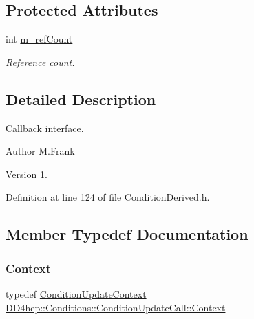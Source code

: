 \subsection*{Protected Attributes}
\begin{DoxyCompactItemize}
\item 
int \hyperlink{class_d_d4hep_1_1_conditions_1_1_condition_update_call_a7456626d494306f498809d5d57150b28}{m\+\_\+ref\+Count}
\begin{DoxyCompactList}\small\item\em Reference count. \end{DoxyCompactList}\end{DoxyCompactItemize}


\subsection{Detailed Description}
\hyperlink{class_d_d4hep_1_1_callback}{Callback} interface. 

\begin{DoxyAuthor}{Author}
M.\+Frank 
\end{DoxyAuthor}
\begin{DoxyVersion}{Version}
1. 
\end{DoxyVersion}


Definition at line 124 of file Condition\+Derived.\+h.



\subsection{Member Typedef Documentation}
\hypertarget{class_d_d4hep_1_1_conditions_1_1_condition_update_call_a96b8a912f3a2ea17f139a5f5dcac7146}{}\label{class_d_d4hep_1_1_conditions_1_1_condition_update_call_a96b8a912f3a2ea17f139a5f5dcac7146} 
\subsubsection{\texorpdfstring{Context}{Context}}
{\footnotesize\ttfamily typedef \hyperlink{class_d_d4hep_1_1_conditions_1_1_condition_update_context}{Condition\+Update\+Context} \hyperlink{class_d_d4hep_1_1_conditions_1_1_condition_update_call_a96b8a912f3a2ea17f139a5f5dcac7146}{D\+D4hep\+::\+Conditions\+::\+Condition\+Update\+Call\+::\+Context}}



